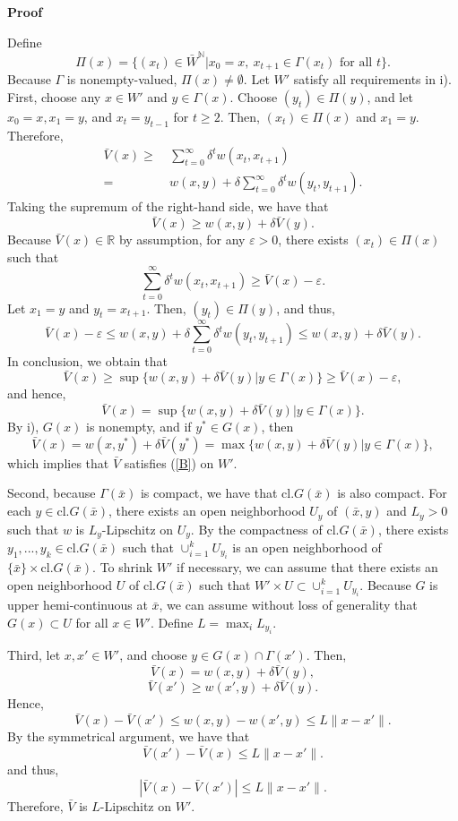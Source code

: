 \documentclass[a4paper,12pt]{article}
\makeatletter
\renewenvironment{proof}[1][\proofname]{\par
  \pushQED{\qed}%
  \normalfont \topsep6\p@\@plus6\p@\relax
  \trivlist
  \item\relax
  {\bfseries
  #1\@addpunct{.}}\hspace\labelsep\ignorespaces
}{%
  \popQED\endtrivlist\@endpefalse
}
\theoremstyle{definition}
\renewcommand{\proofname}{Proof}
\makeatother
\begin{document}
\begin{proof}
Define
\[\Pi(x)=\{(x_t)\in \bar{W}^{\mathbb{N}}|x_0=x,\ x_{t+1}\in \Gamma(x_t)\mbox{ for all }t\}.\]
Because $\Gamma$ is nonempty-valued, $\Pi(x)\neq \emptyset$. Let $W'$ satisfy all requirements in i). First, choose any $x\in W'$ and $y\in \Gamma(x)$. Choose $(y_t)\in \Pi(y)$, and let $x_0=x, x_1=y$, and $x_t=y_{t-1}$ for $t\ge 2$. Then, $(x_t)\in \Pi(x)$ and $x_1=y$. Therefore,
\begin{align*}
\bar{V}(x)\ge&~\sum_{t=0}^{\infty}\delta^tw(x_t,x_{t+1})\\
=&~w(x,y)+\delta\sum_{t=0}^{\infty}\delta^tw(y_t,y_{t+1}).
\end{align*}
Taking the supremum of the right-hand side, we have that
\[\bar{V}(x)\ge w(x,y)+\delta \bar{V}(y).\]
Because $\bar{V}(x)\in \mathbb{R}$ by assumption, for any $\varepsilon>0$, there exists $(x_t)\in \Pi(x)$ such that
\[\sum_{t=0}^{\infty}\delta^tw(x_t,x_{t+1})\ge \bar{V}(x)-\varepsilon.\]
Let $x_1=y$ and $y_t=x_{t+1}$. Then, $(y_t)\in \Pi(y)$, and thus,
\[\bar{V}(x)-\varepsilon\le w(x,y)+\delta \sum_{t=0}^{\infty}\delta^tw(y_t,y_{t+1})\le w(x,y)+\delta \bar{V}(y).\]
In conclusion, we obtain that
\[\bar{V}(x)\ge \sup\{w(x,y)+\delta \bar{V}(y)|y\in \Gamma(x)\}\ge \bar{V}(x)-\varepsilon,\]
and hence,
\[\bar{V}(x)=\sup\{w(x,y)+\delta \bar{V}(y)|y\in \Gamma(x)\}.\]
By i), $G(x)$ is nonempty, and if $y^*\in G(x)$, then
\[\bar{V}(x)=w(x,y^*)+\delta \bar{V}(y^*)=\max\{w(x,y)+\delta \bar{V}(y)|y\in \Gamma(x)\},\]
which implies that $\bar{V}$ satisfies (\ref{B}) on $W'$.

Second, because $\Gamma(\bar{x})$ is compact, we have that $\mbox{cl.}G(\bar{x})$ is also compact. For each $y\in \mbox{cl.}G(\bar{x})$, there exists an open neighborhood $U_y$ of $(\bar{x},y)$ and $L_y>0$ such that $w$ is $L_y$-Lipschitz on $U_y$. By the compactness of $\mbox{cl.}G(\bar{x})$, there exists $y_1,...,y_k\in \mbox{cl.}G(\bar{x})$ such that $\cup_{i=1}^kU_{y_i}$ is an open neighborhood of $\{\bar{x}\}\times \mbox{cl.}G(\bar{x})$. To shrink $W'$ if necessary, we can assume that there exists an open neighborhood $U$ of $\mbox{cl.}G(\bar{x})$ such that $W'\times U\subset \cup_{i=1}^kU_{y_i}$. Because $G$ is upper hemi-continuous at $\bar{x}$, we can assume without loss of generality that $G(x)\subset U$ for all $x\in W'$. Define $L=\max_iL_{y_i}$.

Third, let $x,x'\in W'$, and choose $y\in G(x)\cap \Gamma(x')$. Then,
\[\bar{V}(x)=w(x,y)+\delta \bar{V}(y),\]
\[\bar{V}(x')\ge w(x',y)+\delta \bar{V}(y).\]
Hence,
\[\bar{V}(x)-\bar{V}(x')\le w(x,y)-w(x',y)\le L\|x-x'\|.\]
By the symmetrical argument, we have that
\[\bar{V}(x')-\bar{V}(x)\le L\|x-x'\|.\]
and thus,
\[|\bar{V}(x)-\bar{V}(x')|\le L\|x-x'\|.\]
Therefore, $\bar{V}$ is $L$-Lipschitz on $W'$.


\end{proof}
\end{document}
